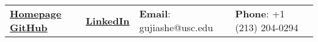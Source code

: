 \documentclass[letterpaper, 10pt]{article}
\begin{document}


\vspace{0.5cm} 
\begin{center}
\begin{tabular}{lllll}
 \href{https://jiashenggu.github.io/}{\textbf{Homepage}} 
 \href{https://github.com/jiashenggu}{\textbf{GitHub}}    &
 \href{https://www.linkedin.com/in/jiasheng-gu/}{\textbf{LinkedIn}} &
 \textbf{Email}: gujiashe@usc.edu      &
 \textbf{Phone}: +1 (213) 204-0294   & 

\end{tabular}
\end{center}


\setlength{\tabcolsep}{2pt}
\end{document}
